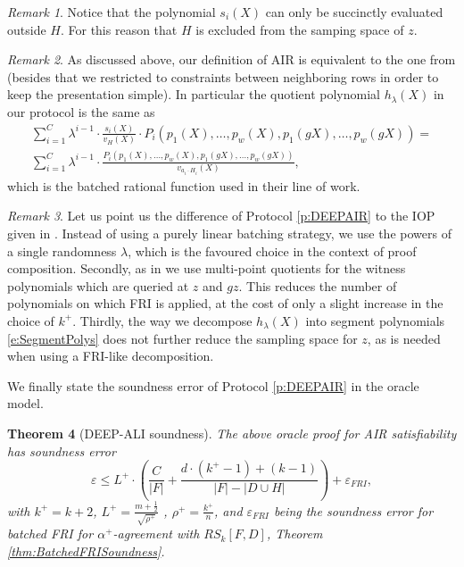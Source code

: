 \documentclass[11pt,article,oneside]{memoir}
\newtheorem{thm}{Theorem}[]
\theoremstyle{definition}
\theoremstyle{remark}
\newtheorem{rem}[thm]{Remark}
\begin{document}
\begin{rem}
Notice that the polynomial $s_i(X)$ can only be succinctly evaluated outside $H$.
For this reason that $H$ is excluded from the samping space of $z$.
\end{rem}

\begin{rem}
As discussed above, our definition of AIR is equivalent to the one from \cite{Starks, DEEPFRI, ethSTARK} (besides that we restricted to constraints between neighboring rows in order to keep the presentation simple). 
In particular the quotient polynomial $h_\lambda(X)$ in our protocol is the same as
\begin{multline*}
\sum_{i=1}^{C} \lambda^{i-1} \cdot\frac{ s_i(X)}{v_H(X)}\cdot P_i(p_1(X),\ldots ,p_w(X),p_1(gX), \ldots, p_w(gX)) =
\\
\sum_{i=1}^{C} \lambda^{i-1} \cdot \frac{P_i(p_1(X),\ldots ,p_w(X),p_1(gX), \ldots, p_w(gX))}{v_{a_i\cdot H_i}(X)},
\end{multline*}
which is the batched rational function used in their line of work.
\end{rem}
\begin{rem}
Let us point us the difference of Protocol \ref{p:DEEPAIR} to the IOP given in \cite{ethSTARK}.
Instead of using a purely linear batching strategy, we use the powers of a single randomness $\lambda$, which is the favoured choice in the context of proof composition.
Secondly, as in \cite{DEEPFRI} we use multi-point quotients for the witness polynomials which are queried at $z$ and $gz$. 
This reduces the number of polynomials on which FRI is applied, at the cost of only a slight increase in the choice of $k^+$.
Thirdly, the way we decompose $h_\lambda(X)$ into segment polynomials  \eqref{e:SegmentPolys} does not further reduce the sampling space for $z$, as is needed when using a FRI-like decomposition.
\end{rem}

We finally state the soundness error of Protocol \ref{p:DEEPAIR} in the oracle model.
\begin{thm}[DEEP-ALI soundness]
\label{thm:DEEPsoundness} 
The above oracle proof for AIR satisfiability has soundness error 
\begin{equation}
\label{e:SoundnessDEEPALI}
\varepsilon \leq L^+ \cdot \left(\frac{C}{|F|} + \frac{d\cdot (k^+ - 1) + (k - 1)}{|F| - |D\cup H|}\right) + \varepsilon_{FRI},
\end{equation}
with  $k^+ = k+2$,  $L^+ = \frac{m+\frac{1}{2}}{\sqrt{\rho^+}}$ , $\rho^+=\frac{k^+}{n}$, and $\varepsilon_{FRI}$ being the soundness error for batched FRI for $\alpha^+$-agreement with $RS_k[F,D]$, Theorem \ref{thm:BatchedFRISoundness}.
\end{thm}
\end{document}
